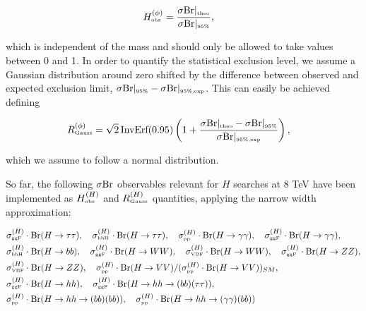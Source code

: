 \documentclass[preprint,3p,12pt]{elsarticle}
\begin{document}
\begin{align}
 H^{(\phi )}_\text{\tiny obs} &= \frac{\sigma {\rm Br}|_{\text{\tiny{theo}}} }{\sigma {\rm Br}|_{\text{\tiny{95\%}}}} , \nonumber
\end{align}

which is independent of the mass and should only be allowed to take values between 0 and 1.
In order to quantify the statistical exclusion level, we assume a Gaussian distribution around zero shifted by the difference between observed and expected exclusion limit, $\sigma {\rm Br}|_{\text{\tiny{95\%}}}-\sigma {\rm Br}|_{\text{\tiny{95\%,exp}}}$. This can easily be achieved defining

\begin{align}
 R^{(\phi )}_\text{\tiny Gauss} &= \sqrt{2} \, \text{InvErf}(0.95) \left( 1 + \frac{\sigma {\rm Br}|_{\text{\tiny{theo}}} - \sigma {\rm Br}|_{\text{\tiny{95\%}}} }{\sigma {\rm Br}|_{\text{\tiny{95\%,exp}}}} \right) , \nonumber
\end{align}

which we assume to follow a normal distribution.

So far, the following $\sigma {\rm Br}$ observables relevant for $H$ searches at 8 TeV have been implemented as $H^{(H)}_\text{\tiny obs}$ and $R^{(H)}_\text{\tiny Gauss}$ quantities, applying the narrow width approximation:

\begin{align}
& \sigma ^{(H)}_{\text{\tiny{ggF}}} \cdot {\rm Br}(H\to \tau \tau ) , \quad \sigma ^{(H)}_{\text{\tiny{bbH}}} \cdot {\rm Br}(H\to \tau \tau ), \quad\sigma ^{(H)}_{\text{\tiny{pp}}} \cdot {\rm Br}(H\to \gamma \gamma ) , \quad \sigma ^{(H)}_{\text{\tiny{ggF}}} \cdot {\rm Br}(H\to \gamma \gamma ), \nonumber \\ %
& \sigma ^{(H)}_{\text{\tiny{bbH}}} \cdot {\rm Br}(H\to bb), \quad \sigma ^{(H)}_{\text{\tiny{ggF}}} \cdot {\rm Br}(H\to WW) , \quad \sigma ^{(H)}_{\text{\tiny{VBF}}} \cdot {\rm Br}(H\to WW), \quad \sigma ^{(H)}_{\text{\tiny{ggF}}} \cdot {\rm Br}(H\to ZZ), \nonumber \\ %
& \sigma ^{(H)}_{\text{\tiny{VBF}}} \cdot {\rm Br}(H\to ZZ), \quad \sigma ^{(H)}_{\text{\tiny{pp}}} \cdot {\rm Br}(H\to VV) /  (\sigma ^{(H)}_{\text{\tiny{pp}}} \cdot {\rm Br}(H\to VV) )_{SM}, \nonumber \\ %
& \sigma ^{(H)}_{\text{\tiny{ggF}}} \cdot {\rm Br}(H\to hh) , \quad \sigma ^{(H)}_{\text{\tiny{ggF}}} \cdot {\rm Br}(H\to hh \to (bb)(\tau \tau )), \nonumber \\ %
& \sigma ^{(H)}_{\text{\tiny{pp}}} \cdot {\rm Br}(H\to hh \to (bb)(bb)) , \quad \sigma ^{(H)}_{\text{\tiny{pp}}} \cdot {\rm Br}(H\to hh \to (\gamma \gamma )(bb)) \nonumber %
\end{align}
\end{document}
